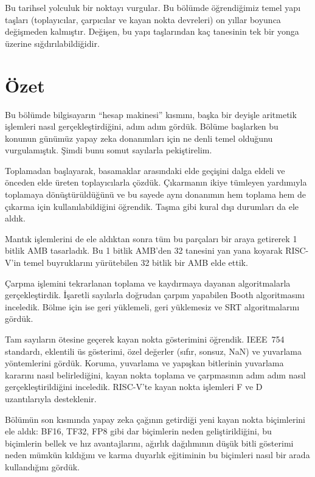 Bu tarihsel yolculuk bir noktayı vurgular. Bu bölümde öğrendiğimiz temel yapı taşları (toplayıcılar, çarpıcılar ve kayan nokta devreleri) on yıllar boyunca değişmeden kalmıştır. Değişen, bu yapı taşlarından kaç tanesinin tek bir yonga üzerine sığdırılabildiğidir.

\section{Özet}

Bu bölümde bilgisayarın ``hesap makinesi'' kısmını, başka bir deyişle aritmetik işlemleri nasıl gerçekleştirdiğini, adım adım gördük. Bölüme başlarken bu konunun günümüz yapay zeka donanımları için ne denli temel olduğunu vurgulamıştık. Şimdi bunu somut sayılarla pekiştirelim.

Toplamadan başlayarak, basamaklar arasındaki elde geçişini dalga eldeli ve önceden elde üreten toplayıcılarla çözdük. Çıkarmanın ikiye tümleyen yardımıyla toplamaya dönüştürüldüğünü ve bu sayede aynı donanımın hem toplama hem de çıkarma için kullanılabildiğini öğrendik. Taşma gibi kural dışı durumları da ele aldık.

Mantık işlemlerini de ele aldıktan sonra tüm bu parçaları bir araya getirerek 1 bitlik AMB tasarladık. Bu 1 bitlik AMB'den 32 tanesini yan yana koyarak RISC-V'in temel buyruklarını yürütebilen 32 bitlik bir AMB elde ettik.

Çarpma işlemini tekrarlanan toplama ve kaydırmaya dayanan algoritmalarla gerçekleştirdik. İşaretli sayılarla doğrudan çarpım yapabilen Booth algoritmasını inceledik. Bölme için ise geri yüklemeli, geri yüklemesiz ve SRT algoritmalarını gördük.

Tam sayıların ötesine geçerek kayan nokta gösterimini öğrendik. IEEE~754 standardı, eklentili üs gösterimi, özel değerler (sıfır, sonsuz, NaN) ve yuvarlama yöntemlerini gördük. Koruma, yuvarlama ve yapışkan bitlerinin yuvarlama kararını nasıl belirlediğini, kayan nokta toplama ve çarpmasının adım adım nasıl gerçekleştirildiğini inceledik. RISC-V'te kayan nokta işlemleri F ve D uzantılarıyla desteklenir.

Bölümün son kısmında yapay zeka çağının getirdiği yeni kayan nokta biçimlerini ele aldık: BF16, TF32, FP8 gibi dar biçimlerin neden geliştirildiğini, bu biçimlerin bellek ve hız avantajlarını, ağırlık dağılımının düşük bitli gösterimi neden mümkün kıldığını ve karma duyarlık eğitiminin bu biçimleri nasıl bir arada kullandığını gördük.

